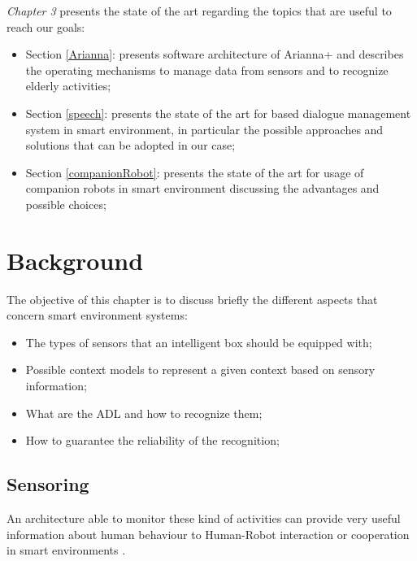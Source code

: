 \documentclass{thesisreport}
\begin{document}
\quad \textit{Chapter 3} presents the state of the art regarding the topics that are useful to reach our goals:
\begin{itemize}
    \item Section \ref{Arianna}: presents software architecture of Arianna+ and describes the operating mechanisms to manage data from sensors and to recognize elderly activities;
    \item Section \ref{speech}: presents the state of the art for based dialogue management system in smart environment, in particular the possible approaches and solutions that can be adopted in our case;
    \item Section \ref{companionRobot}: presents the state of the art for usage of companion robots in smart environment discussing the advantages and possible choices;
\end{itemize}

 \chapter{Background}
The objective of this chapter is to discuss briefly the different aspects that concern smart environment systems:
\begin{itemize}
    \item The types of sensors that an intelligent box should be equipped with;
    \item Possible context models to represent a given context based on sensory information;
    \item What are the ADL and how to recognize them;
    \item How to guarantee the reliability of the recognition;
\end{itemize}

 \section{Sensoring}
 An architecture able to monitor these kind of activities can provide very useful information about human behaviour to Human-Robot interaction or cooperation in smart environments \cite{bruno2014public}.  
 
\end{document}
